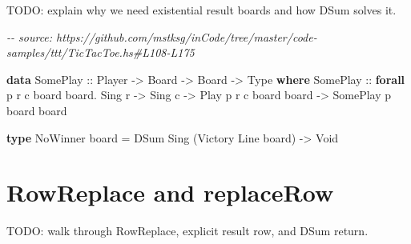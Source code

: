 \documentclass[]{article}
\newenvironment{Shaded}{}{}
\newcommand{\CommentTok}[1]{\textcolor[rgb]{0.38,0.63,0.69}{\textit{#1}}}
\newcommand{\DataTypeTok}[1]{\textcolor[rgb]{0.56,0.13,0.00}{#1}}
\newcommand{\KeywordTok}[1]{\textcolor[rgb]{0.00,0.44,0.13}{\textbf{#1}}}
\newcommand{\NormalTok}[1]{#1}
\newcommand{\OperatorTok}[1]{\textcolor[rgb]{0.40,0.40,0.40}{#1}}
\newcommand{\OtherTok}[1]{\textcolor[rgb]{0.00,0.44,0.13}{#1}}
\begin{document}
TODO: explain why we need existential result boards and how DSum solves it.

\begin{Shaded}
\begin{Highlighting}[]
\CommentTok{{-}{-} source: https://github.com/mstksg/inCode/tree/master/code{-}samples/ttt/TicTacToe.hs\#L108{-}L175}

\KeywordTok{data} \DataTypeTok{SomePlay}\OtherTok{ ::} \DataTypeTok{Player} \OtherTok{{-}\textgreater{}} \DataTypeTok{Board} \OtherTok{{-}\textgreater{}} \DataTypeTok{Board} \OtherTok{{-}\textgreater{}} \DataTypeTok{Type} \KeywordTok{where}
    \DataTypeTok{SomePlay}
\OtherTok{        ::} \KeywordTok{forall}\NormalTok{ p r c board board\textquotesingle{}}\OperatorTok{.}
           \DataTypeTok{Sing}\NormalTok{ r}
        \OtherTok{{-}\textgreater{}} \DataTypeTok{Sing}\NormalTok{ c}
        \OtherTok{{-}\textgreater{}} \DataTypeTok{Play}\NormalTok{ p r c board board\textquotesingle{}}
        \OtherTok{{-}\textgreater{}} \DataTypeTok{SomePlay}\NormalTok{ p board board\textquotesingle{}}

\KeywordTok{type} \DataTypeTok{NoWinner}\NormalTok{ board }\OtherTok{=} \DataTypeTok{DSum} \DataTypeTok{Sing}\NormalTok{ (}\DataTypeTok{Victory} \DataTypeTok{Line}\NormalTok{ board) }\OtherTok{{-}\textgreater{}} \DataTypeTok{Void}
\end{Highlighting}
\end{Shaded}

\section{RowReplace and replaceRow}\label{rowreplace-and-replacerow}

TODO: walk through RowReplace, explicit result row, and DSum return.
\end{document}
